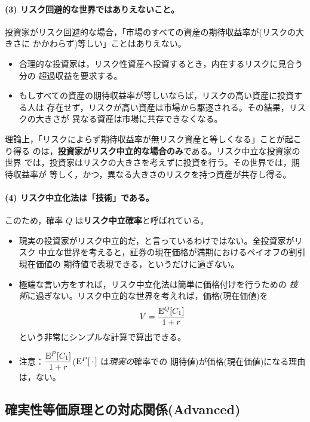 \paragraph{(3) リスク回避的な世界ではありえないこと。}
投資家がリスク回避的な場合，「市場のすべての資産の期待収益率が(リスクの大きさに
かかわらず)等しい」ことはありえない。
\begin{itemize}
\item 合理的な投資家は，リスク性資産へ投資するとき，内在するリスクに見合う分の
超過収益を要求する。
\item もしすべての資産の期待収益率が等しいならば，リスクの高い資産に投資する人は
存在せず，リスクが高い資産は市場から駆逐される。その結果，リスクの大きさが
異なる資産は市場に共存できなくなる。
\end{itemize}
理論上，「リスクによらず期待収益率が無リスク資産と等しくなる」ことが起こり得る
のは，\textbf{投資家がリスク中立的な場合のみ}である。リスク中立な投資家の世界
では，投資家はリスクの大きさを考えずに投資を行う。その世界では，期待収益率が
等しく，かつ，異なる大きさのリスクを持つ資産が共存し得る。

\paragraph{(4) リスク中立化法は「技術」である。}
このため，確率 $Q$ は\textbf{リスク中立確率}と呼ばれている。

\begin{keypoint}[リスク中立化法の正しい理解]
\begin{itemize}
\item 現実の投資家がリスク中立的だ，と言っているわけではない。全投資家がリスク
中立な世界を考えると，証券の現在価格が満期におけるペイオフの割引現在価値の
期待値で表現できる，というだけに過ぎない。
\item 極端な言い方をすれば，リスク中立化法は簡単に価格付けを行うための
\emph{技術}に過ぎない。リスク中立的な世界を考えれば，価格(現在価値)を
\[
V = \frac{\mathrm{E}^Q[C_1]}{1+r}
\]
という非常にシンプルな計算で算出できる。
\item 注意：$\dfrac{\mathrm{E}^P[C_1]}{1+r}$($\mathrm{E}^P[\,\cdot\,]$ は\emph{現実の}確率での
期待値)が価格(現在価値)になる理由は，ない。
\end{itemize}
\end{keypoint}

\subsection{確実性等価原理との対応関係(Advanced)}


